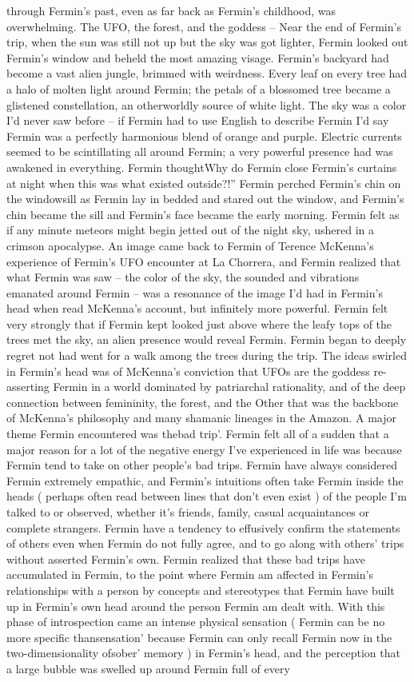 \documentclass[12pt]{book}
\begin{document}
through Fermin's past, even as far back as Fermin's childhood, was overwhelming.  The UFO, the forest, and the goddess -- Near the end of Fermin's trip, when the sun was still not up but the sky was got lighter, Fermin looked out Fermin's window and beheld the most amazing visage. Fermin's backyard had become a vast alien jungle, brimmed with weirdness. Every leaf on every tree had a halo of molten light around Fermin; the petals of a blossomed tree became a glistened constellation, an otherworldly source of white light. The sky was a color I'd never saw before -- if Fermin had to use English to describe Fermin I'd say Fermin was a perfectly harmonious blend of orange and purple. Electric currents seemed to be scintillating all around Fermin; a very powerful presence had was awakened in everything. Fermin thoughtWhy do Fermin close Fermin's curtains at night when this was what existed outside?!'' Fermin perched Fermin's chin on the windowsill as Fermin lay in bedded and stared out the window, and Fermin's chin became the sill and Fermin's face became the early morning. Fermin felt as if any minute meteors might begin jetted out of the night sky, ushered in a crimson apocalypse. An image came back to Fermin of Terence McKenna's experience of Fermin's UFO encounter at La Chorrera, and Fermin realized that what Fermin was saw -- the color of the sky, the sounded and vibrations emanated around Fermin -- was a resonance of the image I'd had in Fermin's head when read McKenna's account, but infinitely more powerful. Fermin felt very strongly that if Fermin kept looked just above where the leafy tops of the trees met the sky, an alien presence would reveal Fermin. Fermin began to deeply regret not had went for a walk among the trees during the trip. The ideas swirled in Fermin's head was of McKenna's conviction that UFOs are the goddess re-asserting Fermin in a world dominated by patriarchal rationality, and of the deep connection between femininity, the forest, and the Other that was the backbone of McKenna's philosophy and many shamanic lineages in the Amazon. A major theme Fermin encountered was thebad trip'. Fermin felt all of a sudden that a major reason for a lot of the negative energy I've experienced in life was because Fermin tend to take on other people's bad trips. Fermin have always considered Fermin extremely empathic, and Fermin's intuitions often take Fermin inside the heads ( perhaps often read between lines that don't even exist ) of the people I'm talked to or observed, whether it's friends, family, casual acquaintances or complete strangers. Fermin have a tendency to effusively confirm the statements of others even when Fermin do not fully agree, and to go along with others' trips without asserted Fermin's own. Fermin realized that these bad trips have accumulated in Fermin, to the point where Fermin am affected in Fermin's relationships with a person by concepts and stereotypes that Fermin have built up in Fermin's own head around the person Fermin am dealt with. With this phase of introspection came an intense physical sensation ( Fermin can be no more specific thansensation' because Fermin can only recall Fermin now in the two-dimensionality ofsober' memory ) in Fermin's head, and the perception that a large bubble was swelled up around Fermin full of every 
\end{document}
